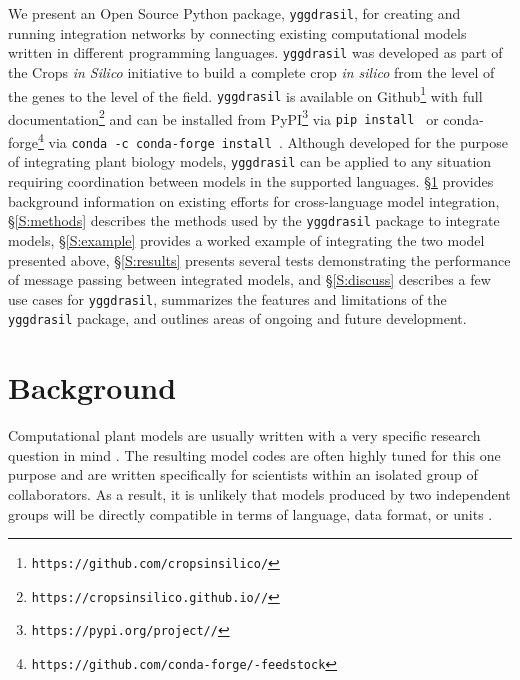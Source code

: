 \documentclass[journal]{IEEEtran}
\newcommand{\todo}[1]{{\color{red}{#1}}}
\newcommand{\pippkg}{\todo{\tt yggdrasil-framework}}
\newcommand{\condapkg}{\todo{\tt yggdrasil}}
\newcommand{\pkg}{{\tt yggdrasil}{}}
\newcommand{\pkglink}{\todo{cis\_interface}}
\begin{document}
We present an Open Source Python package, {\pkg}, for creating and running integration networks by connecting existing computational models written in different programming languages. {\pkg} was developed as part of the Crops \emph{in Silico} \citep{Marshall-Colon2017} initiative to build a complete crop \emph{in silico} from the level of the genes to the level of the field. {\pkg} is available on Github\footnote{{\tt https://github.com/cropsinsilico/\pkglink}} with full documentation\footnote{{\tt https://cropsinsilico.github.io/\pkglink/}} and can be installed from PyPI\footnote{{\tt https://pypi.org/project/\pkglink/}} via {\tt pip install {\pippkg}} or conda-forge\footnote{{\tt https://github.com/conda-forge/\pkglink-feedstock}} via {\tt conda -c conda-forge install {\condapkg}}. Although developed for the purpose of integrating plant biology models, {\pkg} can be applied to any situation requiring coordination between models in the supported languages. \S\ref{S:background} provides background information on existing efforts for cross-language model integration, \S\ref{S:methods} describes the methods used by the {\pkg} package to integrate models, \S\ref{S:example} provides a worked example of integrating the two model presented above, \S\ref{S:results} presents several tests demonstrating the performance of message passing between integrated models, and \S\ref{S:discuss} describes a few use cases for {\pkg}, 
summarizes the features and limitations of the {\pkg} package, and outlines areas of ongoing and future development.

\section{Background}\label{S:background}
%
Computational plant models are usually written with a very specific research question in mind \citep[e.g. describing a specific metabolic pathway in C4 photosynthesis,][]{Wang2014}. The resulting model codes are often highly tuned for this one purpose and are written specifically for scientists within an isolated group of collaborators. As a result, it is unlikely that models produced by two independent groups will be directly compatible in terms of language, data format, or units \citep{Marshall-Colon2017}. 
\end{document}
